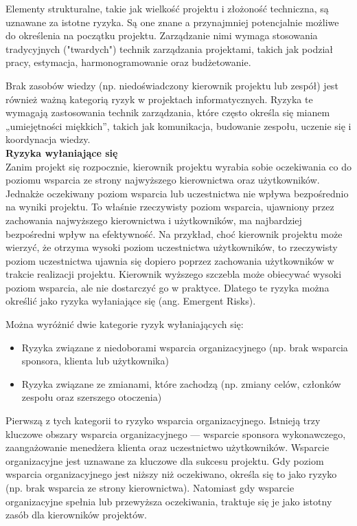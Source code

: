 Elementy strukturalne, takie jak wielkość projektu i złożoność techniczna, są uznawane za istotne ryzyka.\autocite{mcfarlan}\autocite{zmud} Są one znane a przynajmniej potencjalnie możliwe do określenia na początku projektu. Zarządzanie nimi wymaga stosowania tradycyjnych ("twardych") technik zarządzania projektami, takich jak podział pracy, estymacja, harmonogramowanie oraz budżetowanie.

Brak zasobów wiedzy (np. niedoświadczony kierownik projektu lub zespół) jest również ważną kategorią ryzyk w projektach informatycznych.\autocite{mcfarlan}\autocite{barki} Ryzyka te wymagają zastosowania technik zarządzania, które często określa się mianem „umiejętności miękkich”, takich jak komunikacja, budowanie zespołu, uczenie się i koordynacja wiedzy. 
\\
\textbf{Ryzyka wyłaniające się}\\
Zanim projekt się rozpocznie, kierownik projektu wyrabia sobie oczekiwania co do poziomu wsparcia ze strony najwyższego kierownictwa oraz użytkowników. Jednakże oczekiwany poziom wsparcia lub uczestnictwa nie wpływa bezpośrednio na wyniki projektu. To właśnie rzeczywisty poziom wsparcia, ujawniony przez zachowania najwyższego kierownictwa i użytkowników, ma najbardziej bezpośredni wpływ na efektywność.\autocite{chaos} Na przykład, choć kierownik projektu może wierzyć, że otrzyma wysoki poziom uczestnictwa użytkowników, to rzeczywisty poziom uczestnictwa ujawnia się dopiero poprzez zachowania użytkowników w trakcie realizacji projektu. Kierownik wyższego szczebla może obiecywać wysoki poziom wsparcia, ale nie dostarczyć go w praktyce. Dlatego te ryzyka można określić jako ryzyka wyłaniające się (ang. Emergent Risks).

Można wyróżnić dwie kategorie ryzyk wyłaniających się:
\begin{itemize}
    \item Ryzyka związane z niedoborami wsparcia organizacyjnego (np. brak wsparcia sponsora, klienta lub użytkownika)
    \item Ryzyka związane ze zmianami, które zachodzą (np. zmiany celów, członków zespołu oraz szerszego otoczenia)
\end{itemize}\autocite{ryzyka}

Pierwszą z tych kategorii to ryzyko wsparcia organizacyjnego. Istnieją trzy kluczowe obszary wsparcia organizacyjnego — wsparcie sponsora wykonawczego, zaangażowanie menedżera klienta oraz uczestnictwo użytkowników. Wsparcie organizacyjne jest uznawane za kluczowe dla sukcesu projektu. Gdy poziom wsparcia organizacyjnego jest niższy niż oczekiwano, określa się to jako ryzyko (np. brak wsparcia ze strony kierownictwa). Natomiast gdy wsparcie organizacyjne spełnia lub przewyższa oczekiwania, traktuje się je jako istotny zasób dla kierowników projektów.\autocite{keil}\autocite{sharma}\autocite{yetton}

